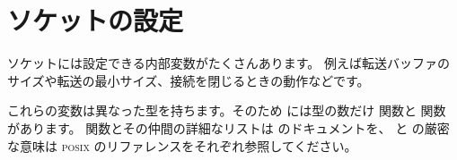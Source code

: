 \section {ソケットの設定}

ソケットには設定できる内部変数がたくさんあります。
例えば転送バッファのサイズや転送の最小サイズ、接続を閉じるときの動作などです。

これらの変数は異なった型を持ちます。そのため \ocaml には型の数だけ
 関数と  関数
があります。
 関数とその仲間の詳細なリストは \ocaml のドキュメントを、
 と  の厳密な意味は
\textsc{posix} のリファレンスをそれぞれ参照してください。

